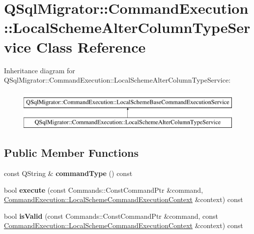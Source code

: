 \hypertarget{class_q_sql_migrator_1_1_command_execution_1_1_local_scheme_alter_column_type_service}{}\section{Q\+Sql\+Migrator\+:\+:Command\+Execution\+:\+:Local\+Scheme\+Alter\+Column\+Type\+Service Class Reference}
\label{class_q_sql_migrator_1_1_command_execution_1_1_local_scheme_alter_column_type_service}
Inheritance diagram for Q\+Sql\+Migrator\+:\+:Command\+Execution\+:\+:Local\+Scheme\+Alter\+Column\+Type\+Service\+:\begin{figure}[H]
\begin{center}
\leavevmode
\includegraphics[height=2.000000cm]{class_q_sql_migrator_1_1_command_execution_1_1_local_scheme_alter_column_type_service}
\end{center}
\end{figure}
\subsection*{Public Member Functions}
\begin{DoxyCompactItemize}
\item 
\mbox{\label{class_q_sql_migrator_1_1_command_execution_1_1_local_scheme_alter_column_type_service_aefaf4a9060755241ec1b103eba13d70a}} 
const Q\+String \& {\bfseries command\+Type} () const
\item 
\mbox{\label{class_q_sql_migrator_1_1_command_execution_1_1_local_scheme_alter_column_type_service_a35eb5d348640016500e5384e0f47d35b}} 
bool {\bfseries execute} (const Commands\+::\+Const\+Command\+Ptr \&command, \hyperlink{class_q_sql_migrator_1_1_command_execution_1_1_local_scheme_command_execution_context}{Command\+Execution\+::\+Local\+Scheme\+Command\+Execution\+Context} \&context) const
\item 
\mbox{\label{class_q_sql_migrator_1_1_command_execution_1_1_local_scheme_alter_column_type_service_a7526664685ce9c82d849a448cb11223a}} 
bool {\bfseries is\+Valid} (const Commands\+::\+Const\+Command\+Ptr \&command, const \hyperlink{class_q_sql_migrator_1_1_command_execution_1_1_local_scheme_command_execution_context}{Command\+Execution\+::\+Local\+Scheme\+Command\+Execution\+Context} \&context) const
\end{DoxyCompactItemize}


